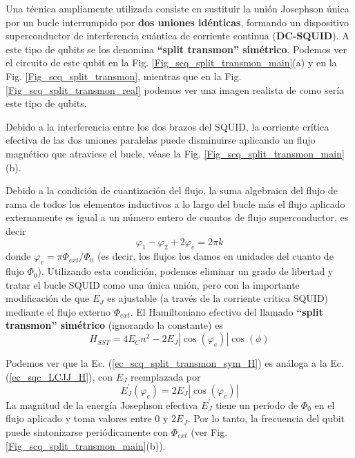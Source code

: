     Una técnica ampliamente utilizada consiste en sustituir la unión Josephson única por un bucle interrumpido por \textbf{dos uniones idénticas}, formando un dispositivo superconductor de interferencia cuántica de corriente continua (\textbf{DC-SQUID}). A este tipo de qubits se los denomina \textbf{``split transmon'' simétrico}. Podemos ver el circuito de este qubit en la Fig. \ref{Fig_scq_split_transmon_main}(a) y en la Fig. \ref{Fig_scq_split_transmon}, mientras que en la Fig. \ref{Fig_scq_split_transmon_real} podemos ver una imagen realista de como sería este tipo de qubits. 
    
    
    Debido a la interferencia entre los dos brazos del SQUID, la corriente crítica efectiva de las dos uniones paralelas puede disminuirse aplicando un flujo magnético que atraviese el bucle, véase la Fig. \ref{Fig_scq_split_transmon_main}(b). 
    
    Debido a la condición de cuantización del flujo, la suma algebraica del flujo de rama de todos los elementos inductivos a lo largo del bucle más el flujo aplicado externamente es igual a un número entero de cuantos de flujo superconductor, es decir
    \begin{equation}
        \varphi_1 - \varphi_2 + 2 \varphi_e = 2 \pi k
    \end{equation}
    donde $\varphi_e = \pi \Phi_{ext}/\Phi_0$ (es decir, los flujos los damos en unidades del cuanto de flujo $\Phi_0$). Utilizando esta condición, podemos eliminar un grado de libertad y tratar el bucle SQUID como una única unión, pero con la importante modificación de que $E_J$ es ajustable (a través de la corriente crítica SQUID) mediante el flujo externo $\Phi_{ext}$. El Hamiltoniano efectivo del llamado \textbf{``split transmon'' simétrico} (ignorando la constante) es
    \begin{equation} \label{ec_scq_split_transmon_sym_H}
        H_{SST} = 4 E_C n^2 - 2 E_J | \cos (\varphi_e) | \cos (\phi)
    \end{equation}

    Podemos ver que la Ec. (\ref{ec_scq_split_transmon_sym_H}) es análoga a la Ec. (\ref{ec_sqc_LCJJ_H}), con $E_J$ reemplazada por 
    \begin{equation}
        E^{'}_J (\varphi_e) = 2 E_J |\cos (\varphi_e)|
    \end{equation}
    La magnitud de la energía Josephson efectiva $E^{'}_J$ tiene un período de $\Phi_0$ en el flujo aplicado y toma valores entre 0 y $2E_J$. Por lo tanto, la frecuencia del qubit puede sintonizarse periódicamente con $\Phi_{ext}$ (ver Fig. \ref{Fig_scq_split_transmon_main}(b)).

